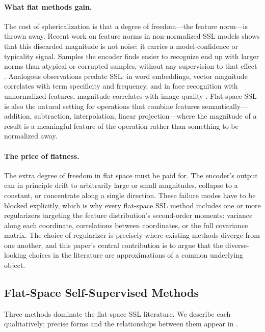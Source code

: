 \paragraph{What flat methods gain.}
The cost of sphericalization is that a degree of freedom---the feature norm---is thrown away. Recent work on feature norms in non-normalized SSL models shows that this discarded magnitude is not noise: it carries a model-confidence or typicality signal. Samples the encoder finds easier to recognize end up with larger norms than atypical or corrupted samples, without any supervision to that effect \citep{draganov2025embedding_norms, kacker2025normconfidence}. Analogous observations predate SSL: in word embeddings, vector magnitude correlates with term specificity and frequency, and in face recognition with unnormalized features, magnitude correlates with image quality \citep{meng2021magface}. Flat-space SSL is also the natural setting for operations that combine features semantically---addition, subtraction, interpolation, linear projection---where the magnitude of a result is a meaningful feature of the operation rather than something to be normalized away.

\paragraph{The price of flatness.}
The extra degree of freedom in flat space must be paid for. The encoder's output can in principle drift to arbitrarily large or small magnitudes, collapse to a constant, or concentrate along a single direction. These failure modes have to be blocked explicitly, which is why every flat-space SSL method includes one or more regularizers targeting the feature distribution's second-order moments: variance along each coordinate, correlations between coordinates, or the full covariance matrix. The choice of regularizer is precisely where existing methods diverge from one another, and this paper's central contribution is to argue that the diverse-looking choices in the literature are approximations of a common underlying object.

\subsection{Flat-Space Self-Supervised Methods}

Three methods dominate the flat-space SSL literature. We describe each qualitatively; precise forms and the relationships between them appear in .


